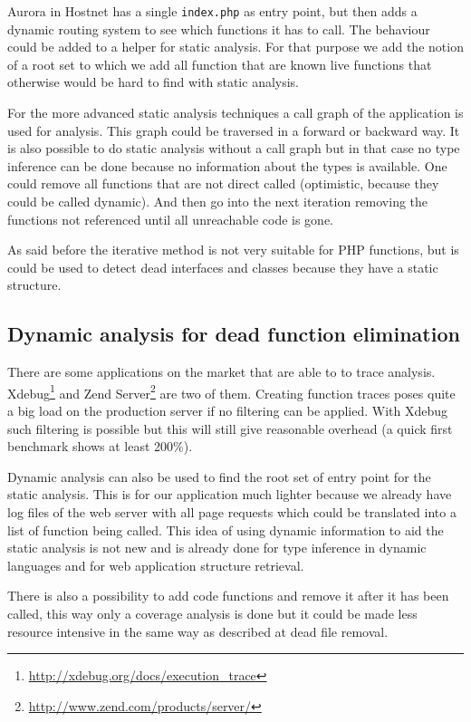 \documentclass[a4paper,10pt,twocolumn]{article}
\begin{document}
Aurora in Hostnet has a single \verb|index.php| as entry point, but then adds a dynamic routing system to see which functions it has to call. The behaviour could be added to a helper for static analysis. For that purpose we add the notion of a root set\cite{srivastava1992} to which we add all function that are known live functions that otherwise would be hard to find with static analysis.

For the more advanced static analysis techniques a call graph of the application is used for analysis. This graph could be traversed in a forward or backward way\cite{bacon1996,biggar2010,chen1998,srivastava1992}. It is also possible to do static analysis without a call graph but in that case no type inference can be done because no information about the types is available. One could remove all functions that are not direct called (optimistic, because they could be called dynamic). And then go into the next iteration removing the functions not referenced until all unreachable code is gone. 

As said before the iterative method is not very suitable for PHP functions, but is could be used to detect dead interfaces and classes because they have a static structure\cite{biggar2010}.
\subsection{Dynamic analysis for dead function elimination}

There are some applications on the market that are able to to trace analysis. Xdebug\footnote{\url{http://xdebug.org/docs/execution_trace}} and Zend Server\footnote{\url{http://www.zend.com/products/server/}} are two of them. 
Creating function traces poses quite a big load on the production server if no filtering can be applied. With Xdebug such filtering is possible but this will still give reasonable overhead (a quick first benchmark shows at least 200\%).

Dynamic analysis can also be used to find the root set of entry point for the static analysis. This is for our application much lighter because we already have log files of the web server with all page requests which could be translated into a list of function being called. This idea of using dynamic information to aid the static analysis is not new and is already done for type inference in dynamic languages\cite{chang2007} and for web application structure retrieval\cite{lucca2005}.

There is also a possibility to add code functions and remove it after it has been called, this way only a coverage analysis is done but it could be made less resource intensive in the same way as described at dead file removal.
\end{document}

